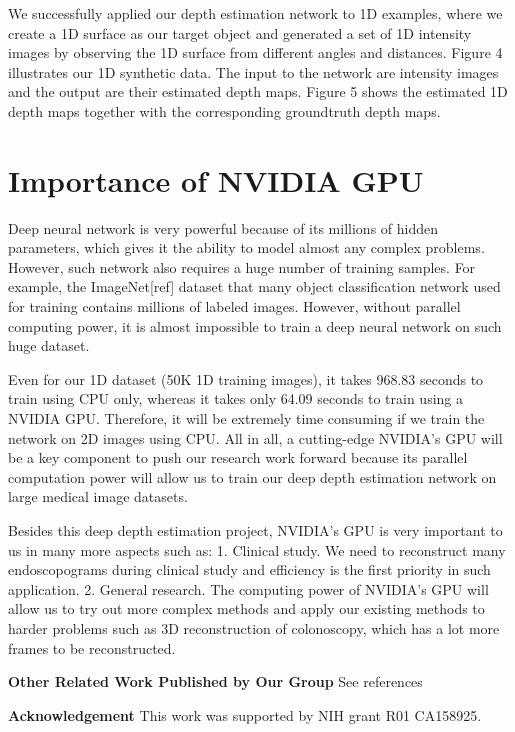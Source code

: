\documentclass{llncs}
\begin{document}
We successfully applied our depth estimation network to 1D examples, where we create a 1D surface as our target object and generated a set of 1D intensity images by observing the 1D surface  from different angles and distances. Figure 4 illustrates our 1D synthetic data. The input to the network are intensity images and the output are their estimated depth maps. Figure 5 shows the estimated 1D depth maps together with the corresponding groundtruth depth maps.

\section{Importance of NVIDIA GPU}

Deep neural network is very powerful because of its millions of hidden parameters, which gives it the ability to model almost any complex problems. However, such network also requires a huge number of training samples. For example, the ImageNet[ref] dataset that many object classification network used for training contains millions of labeled images. However, without parallel computing power, it is almost impossible to train a deep neural network on such huge dataset. 


Even for our 1D dataset (50K 1D training images), it takes 968.83 seconds to train using CPU only, whereas it takes only 64.09 seconds to train using a NVIDIA GPU.  Therefore, it will be extremely time consuming if we train the network on 2D images using CPU. All in all, a cutting-edge NVIDIA’s GPU will be a key component to push our research work forward because its parallel computation power will allow us to train our deep depth estimation network on large medical image datasets.

Besides this deep depth estimation project, NVIDIA's GPU is very important to us in many more aspects such as: 1. Clinical study. We need to reconstruct many endoscopograms during clinical study and efficiency is the first priority in such application.
2. General research. The computing power of NVIDIA's GPU will allow us to try out more complex methods and apply our existing methods to harder problems such as 3D reconstruction of colonoscopy, which has a lot more frames to be reconstructed.



\textbf{Other Related Work Published by Our Group}
See references \cite{zhao2014,zhao2015}

\textbf{Acknowledgement} This work was supported by NIH grant R01 CA158925.










\end{document}
